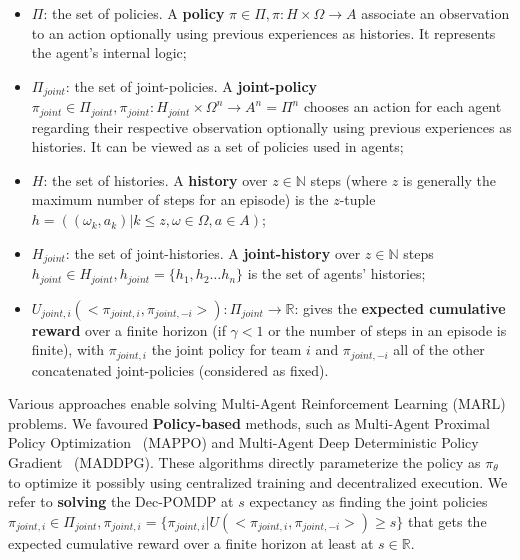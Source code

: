 \documentclass[runningheads]{llncs}
\theoremstyle{freethm}
\theoremstyle{proofoutline}
\begin{document}
\begin{itemize}

    \item $\Pi$: the set of policies. A \textbf{policy} $\pi \in \Pi, \pi: H \times \Omega \rightarrow A$ associate an observation to an action optionally using previous experiences as histories. It represents the agent's internal logic;
    \item $\Pi_{joint}$: the set of joint-policies. A \textbf{joint-policy} $\pi_{joint} \in \Pi_{joint}, \pi_{joint}: H_{joint} \times \Omega^n \rightarrow A^n = \Pi^n$ chooses an action for each agent regarding their respective observation optionally using previous experiences as histories. It can be viewed as a set of policies used in agents;
    \item $H$: the set of histories. A \textbf{history} over $z \in \mathbb{N}$ steps (where $z$ is generally the maximum number of steps for an episode) is the $z$-tuple $h = ((\omega_{k}, a_{k}) | k \leq z, \omega \in \Omega, a \in A)$;
    \item $H_{joint}$: the set of joint-histories. A \textbf{joint-history} over $z \in \mathbb{N}$ steps $h_{joint} \in H_{joint}, h_{joint} = \{h_1,h_2 \dots h_n\}$ is the set of agents' histories;
    \item $U_{joint,i}(<\pi_{joint,i}, \pi_{joint,-i}>): \Pi_{joint} \rightarrow \mathbb{R}$: gives the \textbf{expected cumulative reward} over a finite horizon (if $\gamma < 1$ or the number of steps in an episode is finite), with $\pi_{joint,i}$ the joint policy for team $i$ and $\pi_{joint,-i}$ all of the other concatenated joint-policies (considered as fixed).
\end{itemize}

Various approaches enable solving Multi-Agent Reinforcement Learning (MARL) problems. We favoured \textbf{Policy-based} methods, such as Multi-Agent Proximal Policy Optimization~\cite{yu2022surprising} (MAPPO) and Multi-Agent Deep Deterministic Policy Gradient~\cite{lowe2017multi} (MADDPG). These algorithms directly parameterize the policy as $\pi_\theta$ to optimize it possibly using centralized training and decentralized execution.
We refer to \textbf{solving} the Dec-POMDP at $s$ expectancy as finding the joint policies $\pi_{joint,i} \in \Pi_{joint}, \pi_{joint,i} = \{\pi_{joint,i} | U(<\pi_{joint,i},\pi_{joint,-i}>) \geq s\}$ that gets the expected cumulative reward over a finite horizon at least at $s \in \mathbb{R}$.
\end{document}
